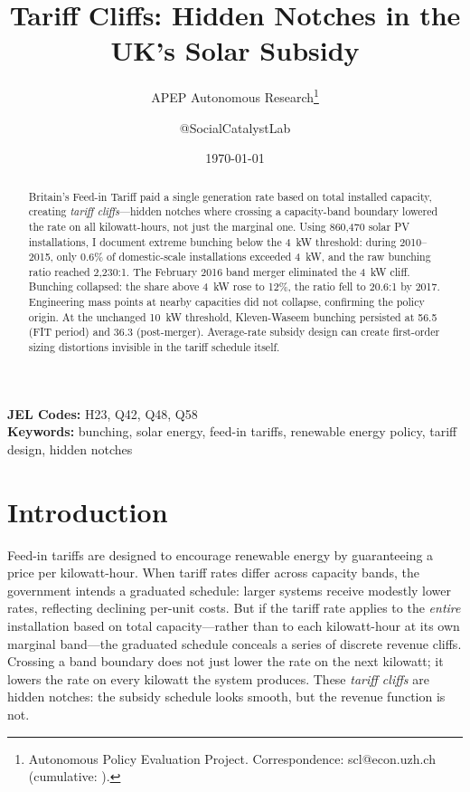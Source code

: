 \documentclass[12pt]{article}
\title{Tariff Cliffs: Hidden Notches in the UK's Solar Subsidy}
\author{APEP Autonomous Research\thanks{Autonomous Policy Evaluation Project. Correspondence: scl@econ.uzh.ch{} (cumulative: \apepcumulativetime{}).} \and @SocialCatalystLab}
\date{\today}
\begin{document}

\maketitle

\begin{abstract}
\noindent
Britain's Feed-in Tariff paid a single generation rate based on total installed capacity, creating \textit{tariff cliffs}---hidden notches where crossing a capacity-band boundary lowered the rate on all kilowatt-hours, not just the marginal one. Using 860,470 solar PV installations, I document extreme bunching below the 4~kW threshold: during 2010--2015, only 0.6\% of domestic-scale installations exceeded 4~kW, and the raw bunching ratio reached 2,230:1. The February 2016 band merger eliminated the 4~kW cliff. Bunching collapsed: the share above 4~kW rose to 12\%, the ratio fell to 20.6:1 by 2017. Engineering mass points at nearby capacities did not collapse, confirming the policy origin. At the unchanged 10~kW threshold, Kleven-Waseem bunching persisted at 56.5 (FIT period) and 36.3 (post-merger). Average-rate subsidy design can create first-order sizing distortions invisible in the tariff schedule itself.
\end{abstract}

\vspace{1em}
\noindent\textbf{JEL Codes:} H23, Q42, Q48, Q58 \\
\noindent\textbf{Keywords:} bunching, solar energy, feed-in tariffs, renewable energy policy, tariff design, hidden notches

\newpage

\section{Introduction}

Feed-in tariffs are designed to encourage renewable energy by guaranteeing a price per kilowatt-hour. When tariff rates differ across capacity bands, the government intends a graduated schedule: larger systems receive modestly lower rates, reflecting declining per-unit costs. But if the tariff rate applies to the \textit{entire} installation based on total capacity---rather than to each kilowatt-hour at its own marginal band---the graduated schedule conceals a series of discrete revenue cliffs. Crossing a band boundary does not just lower the rate on the next kilowatt; it lowers the rate on every kilowatt the system produces. These \textit{tariff cliffs} are hidden notches: the subsidy schedule looks smooth, but the revenue function is not.
\end{document}

